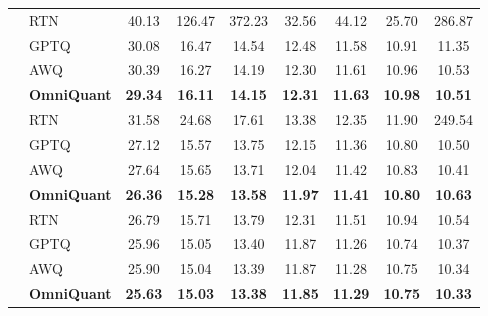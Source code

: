 \documentclass{article} %
\begin{document}
\begin{table}[!ht]
\begin{tabular}{llccccccc}
         \hline
         & RTN & 40.13  & 126.47 & 372.23 & 32.56 & 44.12 & 25.70 & 286.87  \\
         & GPTQ & 30.08  & 16.47 & 14.54 & 12.48 & 11.58 & 10.91 & 11.35 \\
         & AWQ & 30.39  & 16.27 & 14.19 & 12.30 & 11.61 & 10.96 & 10.53   \\
         & \textbf{OmniQuant}  & \textbf{29.34} & \textbf{16.11} & \textbf{14.15} & \textbf{12.31} & \textbf{11.63} & \textbf{10.98} & \textbf{10.51}  \\
         \hline
          & RTN & 31.58  & 24.68 & 17.61 & 13.38 & 12.35 & 11.90 & 249.54  \\
         & GPTQ & 27.12  & 15.57 & 13.75 & 12.15 & 11.36 & 10.80 & 10.50 \\
         & AWQ & 27.64  & 15.65 & 13.71 & 12.04 & 11.42 & 10.83 & 10.41   \\
         & \textbf{OmniQuant}  & \textbf{26.36} & \textbf{15.28} & \textbf{13.58} & \textbf{11.97} & \textbf{11.41} & \textbf{10.80} & \textbf{10.63}  \\
         \hline
          & RTN & 26.79  & 15.71 & 13.79 & 12.31 & 11.51 & 10.94 & 10.54  \\
         & GPTQ & 25.96  & 15.05 & 13.40 & 11.87 & 11.26 & 10.74 & 10.37 \\
         & AWQ & 25.90  & 15.04 & 13.39 & 11.87 & 11.28 & 10.75 & 10.34   \\
         & \textbf{OmniQuant}  & \textbf{25.63} & \textbf{15.03} & \textbf{13.38} & \textbf{11.85} & \textbf{11.29} & \textbf{10.75}   & \textbf{10.33} \\
        \hline
    \end{tabular}
    \label{tab:opt_weight_only_c4}
\end{table}
\end{document}
